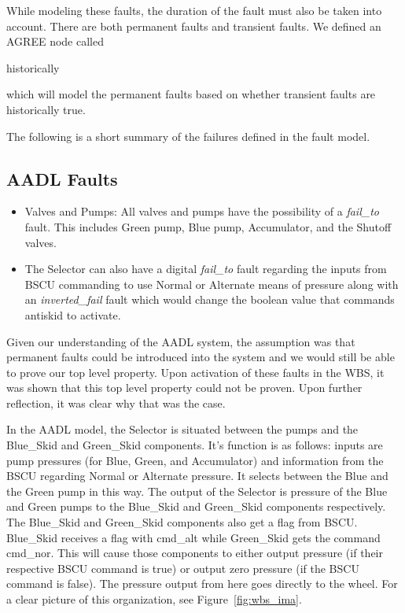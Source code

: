 While modeling these faults, the duration of the fault must also be taken into account. There are both permanent faults and transient faults. We defined an AGREE node called
\begin{tt}
historically
\end{tt}
which will model the permanent faults based on whether transient faults are historically true.

The following is a short summary of the failures defined in the fault model.

\subsection{AADL Faults}
\begin{itemize}

\item Valves and Pumps: All valves and pumps have the possibility of a \textit{fail\_to} fault. This includes Green pump, Blue pump, Accumulator, and the Shutoff valves.

\item  The Selector can also have a digital \textit{fail\_to} fault regarding the inputs from BSCU commanding to use Normal or Alternate means of pressure along with an \textit{inverted\_fail} fault which would change the boolean value that commands antiskid to activate.

\end{itemize}

Given our understanding of the AADL system, the assumption was that permanent faults could be introduced into the system and we would still be able to prove our top level property. Upon activation of these faults in the WBS, it was shown that this top level property could not be proven. Upon further reflection, it was clear why that was the case.

In the AADL model, the Selector is situated between the pumps and the Blue\_Skid and Green\_Skid components. It's function is as follows: inputs are pump pressures (for Blue, Green, and Accumulator) and information from the BSCU regarding Normal or Alternate pressure. It selects between the Blue and the Green pump in this way. The output of the Selector is pressure of the Blue and Green pumps to the Blue\_Skid and Green\_Skid components respectively. The Blue\_Skid and Green\_Skid components also get a flag from BSCU. Blue\_Skid receives a flag with cmd\_alt while Green\_Skid gets the command cmd\_nor. This will cause those components to either output pressure (if their respective BSCU command is true) or output zero pressure (if the BSCU command is false). The pressure output from here goes directly to the wheel. For a clear picture of this organization, see Figure~\ref{fig:wbs_ima}.

